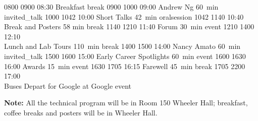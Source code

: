 \begin{timetable}
   {0800} {0900} {08:30 Breakfast}                      {}                            {}        {break}
   {0900} {1000} {09:00 Andrew Ng}                            {60~min}                           {}                      {invited_talk}
   {1000} {1042} {10:00 Short Talks}                          {\vspace{1.5mm}42~min}             {}        {oralsession}
   {1042} {1140} {10:40 Break and Posters}                    {\vspace{1.5mm}58 min}             {}      {break}
   {1140} {1210} {11:40 Forum}                                {\vspace{1.5mm}30~min}             {}                      {event}
   {1210} {1400} {12:10\\[0.2em]Lunch and Lab Tours}          {110~min}                          {}                            {break}
   {1400} {1500} {14:00 Nancy Amato}                          {60~min}                           {}                      {invited_talk}
   {1500} {1600} {15:00 Early Career Spotlights} 	      {\vspace{1.5mm}60~min}             {}        {event}
   {1600} {1630} {16:00 Awards} 	              {\vspace{1.5mm}15~min}             {}        {event}
   {1630} {1705} {16:15 Farewell} 	              {\vspace{1.5mm}45~min}             {}        {break}
   {1705} {2200} {17:00\\\vspace{0.3em}Buses Depart for Google}     {}                              {at Google}     {event}
\end{timetable}

\begingroup
\footnotesize{\textbf{Note:} All the technical program will be in Room 150 Wheeler Hall; breakfast, coffee breaks and posters will be in Wheeler Hall.}
\endgroup




\begingroup %
\sffamily



